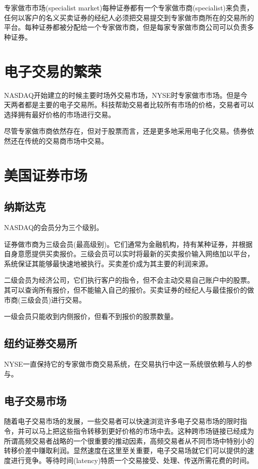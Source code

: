 \documentclass{article}
\begin{document}
\hspace*{\fill}

专家做市市场(specialist market)每种证券都有一个专家做市商(specialist)来负责，任何以客户的名义买卖证券的经纪人必须把交易提交到专家做市商所在的交易所的平台。每种证券都被分配给一个专家做市商，但是每家专家做市商公司可以负责多种证券。

\section{电子交易的繁荣}
NASDAQ开始建立的时候主要时场外交易市场，NYSE时专家做市市场。但是今天两者都是主要的电子交易所。科技帮助交易者比较所有市场的价格，交易者可以选择拥有最好价格的市场进行交易。

尽管专家做市商依然存在，但对于股票而言，还是更多地采用电子化交易。债券依然还在传统的交易商市场中交易。

\section{美国证券市场}
\subsection{纳斯达克}
NASDAQ的会员分为三个级别。

证券做市商为三级会员(最高级别)。它们通常为金融机构，持有某种证券，并根据自身意愿提供买卖报价。三级会员可以实时将最新的买卖报价输入网络加以平台，系统保证其能够最快速地被执行。买卖差价成为其主要的利润来源。

二级会员为经济公司，它们执行客户的指令，但不会主动交易自己账户中的股票。其可以查询所有报价，但不能输入自己的报价。买卖证券的经纪人与最佳报价的做市商(三级会员)进行交易。

一级会员只能收到内侧报价，但看不到报价的股票数量。

\subsection{纽约证券交易所}
NYSE一直保持它的专家做市商交易系统，在交易执行中这一系统很依赖与人的参与。

\subsection{电子交易市场}
随着电子交易市场的发展，一些交易者可以快速浏览许多电子交易市场的限时指令，并可以马上把这些指令转移到更好价格的市场中去。这种跨市场链接已经成为所谓高频交易者战略的一个很重要的推动因素，高频交易者从不同市场中特别小的转移价差中赚取利润。显然速度在这里至关重要，电子交易场就它们可以提供的速度进行竞争。等待时间(latency)特质一个交易接受、处理、传送所需花费的时间。
\end{document}
